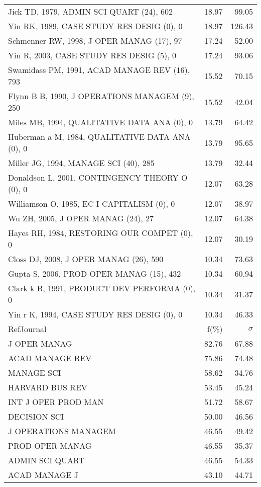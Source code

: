 \documentclass[a4paper,11pt]{report}
\begin{document}
\begin{landscape}
\begin{table}[!ht]
{\begin{tabular}{|l r r|}
Jick TD, 1979, ADMIN SCI QUART (24), 602 & 18.97 & 99.05\\
Yin RK, 1989, CASE STUDY RES DESIG (0), 0 & 18.97 & 126.43\\
Schmenner RW, 1998, J OPER MANAG (17), 97 & 17.24 & 52.00\\
Yin R, 2003, CASE STUDY RES DESIG (5), 0 & 17.24 & 93.06\\
Swamidass PM, 1991, ACAD MANAGE REV (16), 793 & 15.52 & 70.15\\
Flynn B B, 1990, J OPERATIONS MANAGEM (9), 250 & 15.52 & 42.04\\
Miles MB, 1994, QUALITATIVE DATA ANA (0), 0 & 13.79 & 64.42\\
Huberman a M, 1984, QUALITATIVE DATA ANA (0), 0 & 13.79 & 95.65\\
Miller JG, 1994, MANAGE SCI (40), 285 & 13.79 & 32.44\\
Donaldson L, 2001, CONTINGENCY THEORY O (0), 0 & 12.07 & 63.28\\
Williamson O, 1985, EC I CAPITALISM (0), 0 & 12.07 & 38.97\\
Wu ZH, 2005, J OPER MANAG (24), 27 & 12.07 & 64.38\\
Hayes RH, 1984, RESTORING OUR COMPET (0), 0 & 12.07 & 30.19\\
Closs DJ, 2008, J OPER MANAG (26), 590 & 10.34 & 73.63\\
Gupta S, 2006, PROD OPER MANAG (15), 432 & 10.34 & 60.94\\
Clark k B, 1991, PRODUCT DEV PERFORMA (0), 0 & 10.34 & 31.37\\
Yin r K, 1994, CASE STUDY RES DESIG (0), 0 & 10.34 & 46.33\\
\hline
\hline
RefJournal & f(\%) & $\sigma$\\
\hline
J OPER MANAG & 82.76 & 67.88\\
ACAD MANAGE REV & 75.86 & 74.48\\
MANAGE SCI & 58.62 & 34.76\\
HARVARD BUS REV & 53.45 & 45.24\\
INT J OPER PROD MAN & 51.72 & 58.67\\
DECISION SCI & 50.00 & 46.56\\
J OPERATIONS MANAGEM & 46.55 & 49.42\\
PROD OPER MANAG & 46.55 & 35.37\\
ADMIN SCI QUART & 46.55 & 54.33\\
ACAD MANAGE J & 43.10 & 44.71\\
\hline
\end{tabular}
}
\end{table}

\end{landscape}
\end{document}
